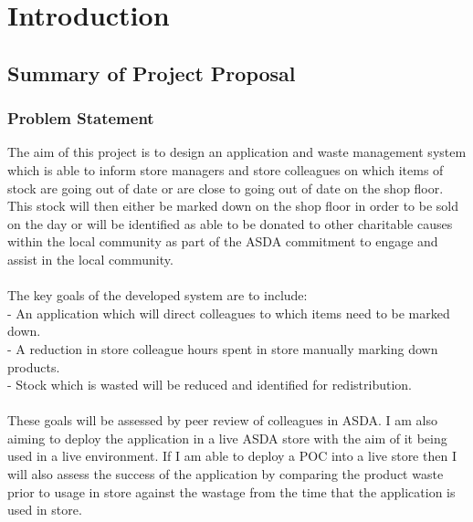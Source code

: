 \documentclass[a4paper,11pt]{report}
\begin{document}
\newpage




\newpage



\tableofcontents





\chapter{Introduction}\label{chap:intro}

\section{Summary of Project Proposal}

\subsection{Problem Statement}\label{sec:problem}
The aim of this project is to design an application and waste management system which is able
to inform store managers and store colleagues on which items of stock are going out of date or are
close to going out of date on the shop floor. This stock will then either be marked 
down on the shop floor in order to be sold on the day or will be identified as able to be donated to other charitable
causes within the local community as part of the ASDA commitment to engage and assist in the local community.
\\
\\
The key goals of the developed system are to include:
\\
- An application which will direct colleagues to which items need to be marked down.
\\
- A reduction in store colleague hours spent in store manually marking down products.
\\
- Stock which is wasted will be reduced and identified for redistribution.
\\
\\
These goals will be assessed by peer review of colleagues in ASDA. I am also aiming to 
deploy the application in a live ASDA store with the aim of it being used in a live environment.
If I am able to deploy a POC into a live store then I will also assess the success of the 
application by comparing the product waste prior to usage in store against the wastage from 
the time that the application is used in store. 
\end{document}
